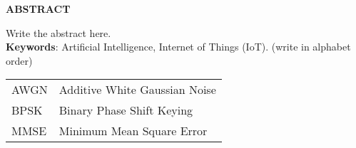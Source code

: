 

\thispagestyle{plain}
\begin{center}
    \Large \textbf{\uppercase{Abstract}}
\end{center}
\vspace{3\baselineskip}
\noindent
Write the abstract here. \\




\vspace{\baselineskip}
\noindent
\textbf{Keywords}:  Artificial Intelligence, Internet of Things (IoT). (write in alphabet order)




\newpage

\thispagestyle{plain}

\vspace{3\baselineskip}
\noindent


\begin{tabular}{l l}
AWGN &\hspace{1cm} Additive White Gaussian Noise\\
BPSK &\hspace{1cm} Binary Phase Shift Keying\\
MMSE &\hspace{1cm} Minimum Mean Square Error
\end{tabular}


